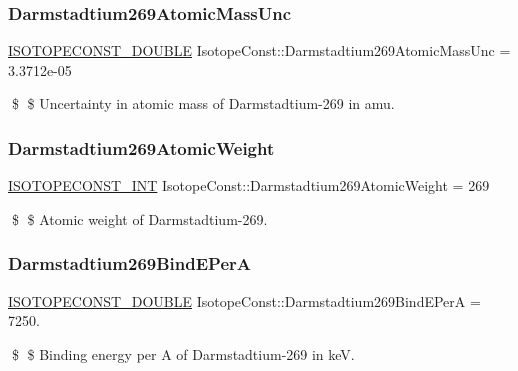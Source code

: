 \subsubsection{\texorpdfstring{Darmstadtium269\+Atomic\+Mass\+Unc}{Darmstadtium269AtomicMassUnc}}
{\footnotesize\ttfamily \mbox{\hyperlink{group___isotope_const-_macros_ga8f45a7272ce02c0b4c65c44636ed719a}{I\+S\+O\+T\+O\+P\+E\+C\+O\+N\+S\+T\+\_\+\+D\+O\+U\+B\+LE}} Isotope\+Const\+::\+Darmstadtium269\+Atomic\+Mass\+Unc = 3.\+3712e-\/05}

\$ \$ Uncertainty in atomic mass of Darmstadtium-\/269 in amu. \mbox{\label{group___isotope_const-_darmstadtium-_ds269_ga9310eceab44f2c786b153033a358255a}} 
\subsubsection{\texorpdfstring{Darmstadtium269\+Atomic\+Weight}{Darmstadtium269AtomicWeight}}
{\footnotesize\ttfamily \mbox{\hyperlink{group___isotope_const-_macros_ga5f18360b3e99483a35c32d789e62621c}{I\+S\+O\+T\+O\+P\+E\+C\+O\+N\+S\+T\+\_\+\+I\+NT}} Isotope\+Const\+::\+Darmstadtium269\+Atomic\+Weight = 269}

\$ \$ Atomic weight of Darmstadtium-\/269. \mbox{\label{group___isotope_const-_darmstadtium-_ds269_ga21f698066a2a0cea2f6f39242f8859b3}} 
\subsubsection{\texorpdfstring{Darmstadtium269\+Bind\+E\+PerA}{Darmstadtium269BindEPerA}}
{\footnotesize\ttfamily \mbox{\hyperlink{group___isotope_const-_macros_ga8f45a7272ce02c0b4c65c44636ed719a}{I\+S\+O\+T\+O\+P\+E\+C\+O\+N\+S\+T\+\_\+\+D\+O\+U\+B\+LE}} Isotope\+Const\+::\+Darmstadtium269\+Bind\+E\+PerA = 7250.}

\$ \$ Binding energy per A of Darmstadtium-\/269 in keV. \mbox{\label{group___isotope_const-_darmstadtium-_ds269_ga6dcb72d4e5d6ca49694118ecc63933a9}} 
